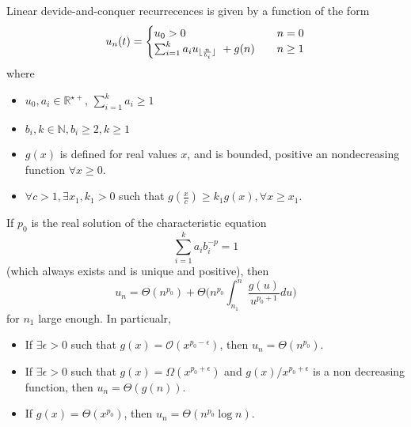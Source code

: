  Linear devide-and-conquer recurrecences is given by a function of the form\begin{equation}
 u_n(t) = 
 	\begin{cases}
			u_0 > 0 & n= 0 \\
			\sum_{i=1}^k a_i u_{\lfloor\frac{n}{b_i}\rfloor} \ + g(n) \quad &n  \geq 1 
	\end{cases}
 \end{equation}
 where
 \begin{itemize}
 \item $u_0, a_i \in \mathbb{R}^{\star+}$, $\sum_{i=1}^k a_i \geq 1$
 \item $b_{i}, k \in \mathbb{N}, b_i \geq 2, k\geq 1$
 \item $g(x)$ is defined for real values $x$, and is bounded, positive an nondecreasing function $\forall x\geq 0$.
 \item $\forall c > 1, \exists x_1, k_1 >0$ such that $g(\frac{x}{c}) \geq k_1 g(x), \forall x \geq x_1$. 
 \end{itemize}
 
 \begin{theorem}
 \label{thm:AkraAndBazzi}
 If $p_0$ is the real solution of the characteristic equation
 \begin{equation}
 \label{eq:characteristicequation}
 \sum_{i=1}^k a_i b_i ^{-p} = 1
 \end{equation}
 (which always exists and is unique and positive), then 
 \begin{equation}
 u_n = \Theta(n^{p_0}) + \Theta \Big( n^{p_0} \int_{n_1}^n \frac{g(u)}{u^{p_0+1}}  du \Big)
 \end{equation}
 for $n_1$ large enough. In particualr,
 \begin{itemize}
 \item If $\exists \epsilon >0$ such that $g(x)=\mathcal{O}(x^{p_0-\epsilon})$, then $u_n = \Theta (n^{p_0})$.
 \item If $\exists \epsilon > 0$ such that $g(x) = \Omega(x^{p_0 + \epsilon})$ and $g(x)/ x^{p_0+\epsilon}$ is a non decreasing function, then $u_n = \Theta(g(n))$.
 \item If $g(x) = \Theta(x^{p_0})$, then $u_{n} = \Theta(n^{p_0} \log n)$. 
 \end{itemize}
 \end{theorem}
 
